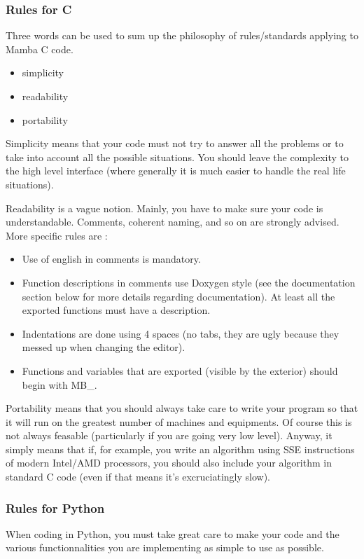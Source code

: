 \documentclass[a4paper,10pt,oneside]{article}
\begin{document}
\subsubsection{Rules for C}

Three words can be used to sum up the philosophy of rules/standards
applying to Mamba C code.
\begin{itemize}
\item simplicity 
\item readability 
\item portability 
\end{itemize}
Simplicity means that your code must not try to answer all the problems
or to take into account all the possible situations. You should leave
the complexity to the high level interface (where generally it is
much easier to handle the real life situations).

Readability is a vague notion. Mainly, you have to make sure your
code is understandable. Comments, coherent naming, and so on are strongly
advised. More specific rules are :
\begin{itemize}
\item Use of english in comments is mandatory.
\item Function descriptions in comments use Doxygen style (see the documentation
section below for more details regarding documentation). At least all the 
exported functions must have a description.
\item Indentations are done using 4 spaces (no tabs, they are ugly because
they messed up when changing the editor). 
\item Functions and variables that are exported (visible by the exterior)
should begin with \textquotedbl{}MB\_\textquotedbl{}. 
\end{itemize}
Portability means that you should always take care to write your program
so that it will run on the greatest number of machines and equipments.
Of course this is not always feasable (particularly if you are going
very low level). Anyway, it simply means that if, for example, you
write an algorithm using SSE instructions of modern Intel/AMD processors,
you should also include your algorithm in standard C code (even if
that means it's excruciatingly slow).

\subsubsection{Rules for Python}
\label{cha:rules}

When coding in Python, you must take great care to make your code and the
various functionnalities you are implementing as simple to use as possible.
\end{document}
